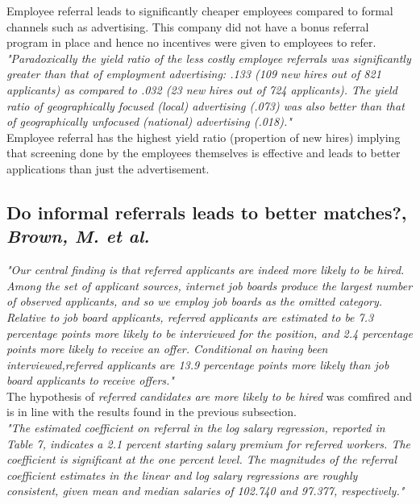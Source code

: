 \documentclass[a4paper, 11pt]{article} %
\begin{document}
Employee referral leads to significantly cheaper employees compared to formal channels such as advertising. This company did not have a bonus referral program in place and hence no incentives were given to employees to refer.\\

\emph{"Paradoxically the yield ratio of the less costly employee referrals was
significantly greater than that of employment advertising: .133 (109 new
hires out of 821 applicants) as compared to .032 (23 new hires out of 724
applicants). The yield ratio of geographically focused (local) advertising
(.073) was also better than that of geographically unfocused (national)
advertising (.018)."}\\

Employee referral has the highest yield ratio (propertion of new hires) implying that screening done by the employees themselves is effective and leads to better applications than just the advertisement.

\subsection*{Do informal referrals leads to better matches?, \emph{Brown, M. et al.} \cite{fifth}}

\emph{"Our central finding is that referred applicants are indeed more likely to be hired. Among the
set of applicant sources, internet job boards produce the largest number of observed applicants,
and so we employ job boards as the omitted category. Relative to job board applicants, referred
applicants are estimated to be 7.3 percentage points more likely to be interviewed for the position,
and 2.4 percentage points more likely to receive an offer. Conditional on having been interviewed,referred applicants are 13.9 percentage points more likely than job board applicants to receive
offers."}\\

The hypothesis of \emph{referred candidates are more likely to be hired} was comfired and is in line with the results found in the previous subsection.\\

\emph{"The estimated coefficient on referral in the log salary regression, reported in Table 7, indicates
a 2.1 percent starting salary premium for referred workers. The coefficient is significant at the
one percent level. The magnitudes of the referral coefficient estimates in the linear and log salary
regressions are roughly consistent, given mean and median salaries of 102.740 and 97.377, respectively."}\\
\end{document}
